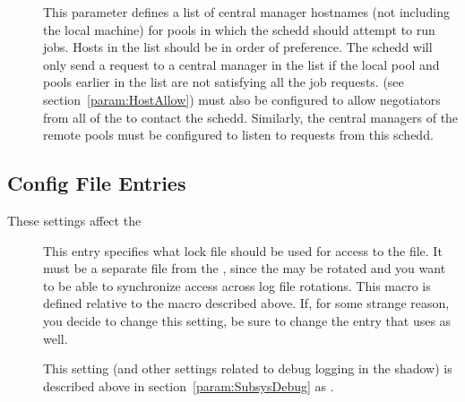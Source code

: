 \begin{description}
\item[] \label{param:FlockHosts} This parameter
  defines a list of central manager hostnames (not including the local
   machine) for pools in which the schedd should
  attempt to run jobs.  Hosts in the list should be in order of
  preference.  The schedd will only send a request to a central
  manager in the list if the local pool and pools earlier in the list
  are not satisfying all the job requests.
   (see
  section~\ref{param:HostAllow}) must also be configured to allow
  negotiators from all of the  to contact the
  schedd.  Similarly, the central managers of the remote pools must be
  configured to listen to requests from this schedd.

\end{description}

\subsection{\label{sec:Shadow-Config-File-Entries}
 Config File Entries}

These settings affect the 
\begin{description}

\item[] \label{param:ShadowLock} This entry
  specifies what lock file should be used for access to the
   file.  It must be a separate file from the
  , since the  may be rotated and you
  want to be able to synchronize access across log file rotations.
  This macro is defined relative to the  macro described
  above.  If, for some strange reason, you decide to change this
  setting, be sure to change the  entry that
   uses as well.

\item[] \label{param:ShadowDebug} This setting
  (and other settings related to debug logging in the shadow) is
  described above in section~\ref{param:SubsysDebug} as
  .

\end{description}

